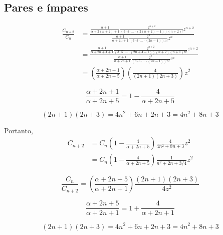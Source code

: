 \documentclass[10pt,a4paper]{article}%
\begin{document}
\subsection{Pares e ímpares}
\begin{equation}
\begin{split}
\frac{C_{n+2}}{C_n} &=
\frac{\frac{\alpha+1}{\alpha+2(n+2)+1} \frac{2^{n+2}}{\left(3\cdot 5\cdot\ldots\cdot \left(2(n+2)-1\right)\right)(n+2)!} z^{n+2}}{\frac{\alpha+1}{\alpha+2n+1} \frac{2^n}{\left(3\cdot 5\cdot\ldots\cdot \left(2n-1\right)\right)n!} z^n} \\
&=
\frac{\frac{\alpha+1}{\alpha+2n+4+1} \frac{2^{n+2}}{\left(3\cdot 5\cdot\ldots\cdot \left(2n+4-1\right)\right)(n+2)(n+1)n!} z^{n+2}}{\frac{\alpha+1}{\alpha+2n+1} \frac{2^n}{\left(3\cdot 5\cdot\ldots\cdot \left(2n-1\right)\right)n!} z^n} \\
&=
\left(\frac{\alpha+2n+1}{\alpha+2n+5}\right)\left(\frac{4}{(2n+1)(2n+3)}\right)z^2
\end{split}
\end{equation}

\begin{equation}
\frac{\alpha+2n+1}{\alpha+2n+5} = 1 - \frac{4}{\alpha+2n+5}
\end{equation}

\begin{equation}
(2n+1)(2n+3) = 4n^2 + 6n + 2n + 3 = 4n^2 + 8n +3
\end{equation}

Portanto,
\begin{equation}
\begin{split}
C_{n+2}
&= C_n \left(1 - \frac{4}{\alpha+2n+5}\right) \frac{4}{4n^2 + 8n +3} z^2 \\
&= C_n \left(1 - \frac{4}{\alpha+2n+5}\right) \frac{1}{n^2 + 2n +3/4} z^2
\end{split}
\end{equation}



\begin{equation}
\frac{C_n}{C_{n+2}}=
\left(\frac{\alpha+2n+5}{\alpha+2n+1}\right)\frac{(2n+1)(2n+3)}{4z^2}
\end{equation}

\begin{equation}
\frac{\alpha+2n+5}{\alpha+2n+1}
=1+\frac{4}{\alpha+2n+1}
\end{equation}

\begin{equation}
(2n+1)(2n+3) = 4n^2+6n+2n+3 = 4n^2+8n+3
\end{equation}
\end{document}
